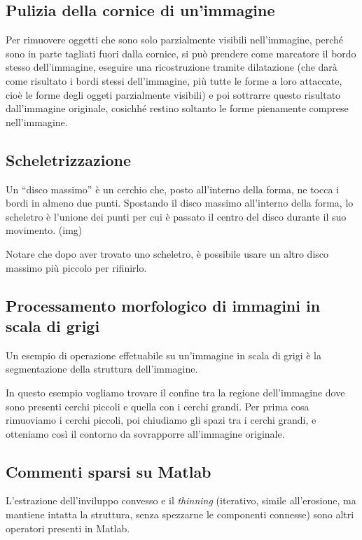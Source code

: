 \documentclass[a4paper,11pt]{article}
\begin{document}
\subsection{Pulizia della cornice di un'immagine}
Per rimuovere oggetti che sono solo parzialmente visibili nell'immagine, perché sono in parte tagliati fuori dalla cornice, si può prendere come
marcatore il bordo stesso dell'immagine, eseguire una ricostruzione tramite dilatazione (che darà come risultato i bordi stessi dell'immagine, più tutte le
forme a loro attaccate, cioè le forme degli oggeti parzialmente visibili) e poi sottrarre questo risultato dall'immagine originale,
cosichhé restino soltanto le forme pienamente comprese nell'immagine.

\subsection{Scheletrizzazione}
Un ``disco massimo'' è un cerchio che, posto all'interno della forma, ne tocca i bordi in almeno due punti. Spostando il disco massimo
all'interno della forma, lo scheletro è l'unione dei punti per cui è passato il centro del disco durante il suo movimento.
(img)
\par
Notare che
dopo aver trovato uno scheletro, è possibile usare un altro disco massimo più piccolo per rifinirlo.

\subsection{Processamento morfologico di immagini in scala di grigi}
Un esempio di operazione effetuabile su un'immagine in scala di grigi è la segmentazione della struttura dell'immagine.
\par
In questo esempio vogliamo trovare il confine tra la regione dell'immagine dove sono presenti cerchi piccoli e quella con i cerchi grandi.
Per prima cosa rimuoviamo i cerchi piccoli, poi chiudiamo gli spazi tra i cerchi grandi, e otteniamo così il contorno da sovrapporre
all'immagine originale.

\subsection{Commenti sparsi su Matlab}
L'estrazione dell'inviluppo convesso e il \textit{thinning} (iterativo, simile all'erosione, ma mantiene intatta la struttura, senza
spezzarne le componenti connesse) sono altri operatori presenti in Matlab.

\newpage
\end{document}
